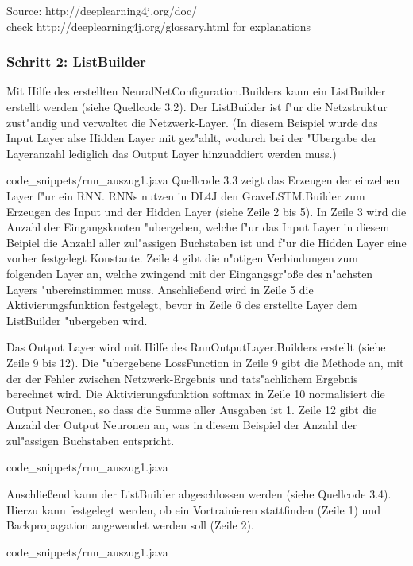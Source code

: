 {Source:
http://deeplearning4j.org/doc/ \\
check http://deeplearning4j.org/glossary.html for explanations

\subsubsection{Schritt 2: ListBuilder}
Mit Hilfe des erstellten NeuralNetConfiguration.Builders kann ein ListBuilder erstellt werden (siehe Quellcode 3.2). Der ListBuilder ist f"ur die Netzstruktur zust"andig und verwaltet die Netzwerk-Layer. (In diesem Beispiel wurde das Input Layer alse Hidden Layer mit gez"ahlt, wodurch bei der "Ubergabe der Layeranzahl lediglich das Output Layer hinzuaddiert werden muss.)


{code_snippets/rnn_auszug1.java}
Quellcode 3.3 zeigt das Erzeugen der einzelnen Layer f"ur ein RNN. RNNs nutzen in DL4J den GraveLSTM.Builder zum Erzeugen des Input und der Hidden Layer (siehe Zeile 2 bis 5). In Zeile 3 wird die Anzahl der Eingangsknoten "ubergeben, welche f"ur das Input Layer in diesem Beipiel die Anzahl aller zul"assigen Buchstaben ist und f"ur die Hidden Layer eine vorher festgelegt Konstante. Zeile 4 gibt die n"otigen Verbindungen zum folgenden Layer an, welche zwingend mit der Eingangsgr"o{\ss}e des n"achsten Layers "ubereinstimmen muss. Anschlie{\ss}end wird in Zeile 5 die Aktivierungsfunktion festgelegt, bevor in Zeile 6 des erstellte Layer dem ListBuilder "ubergeben wird.

Das Output Layer wird mit Hilfe des RnnOutputLayer.Builders erstellt (siehe Zeile 9 bis 12). Die "ubergebene LossFunction in Zeile 9 gibt die Methode an, mit der der Fehler zwischen Netzwerk-Ergebnis und tats"achlichem Ergebnis berechnet wird. Die Aktivierungsfunktion \glqq softmax\grqq{} in Zeile 10 normalisiert die Output Neuronen, so dass die Summe aller Ausgaben ist 1. Zeile 12 gibt die Anzahl der Output Neuronen an, was in diesem Beispiel der Anzahl der zul"assigen Buchstaben entspricht.


{code_snippets/rnn_auszug1.java}

Anschlie{\ss}end kann der ListBuilder abgeschlossen werden (siehe Quellcode 3.4). Hierzu kann festgelegt werden, ob ein Vortrainieren stattfinden (Zeile 1) und Backpropagation angewendet werden soll (Zeile 2).

{code_snippets/rnn_auszug1.java}

}
